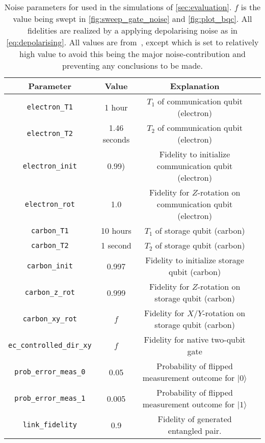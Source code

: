 \begin{table}
  \centering
  \begin{tabular}{||c|c|c|c||}
    \hline
    Parameter                 & Value        & Explanation                                                 \\
    \hline\hline
    \texttt{electron\_T1}          & 1 hour       & $T_1$ of communication qubit (electron)                     \\
    \texttt{electron\_T2}          & 1.46 seconds & $T_2$ of communication qubit (electron)                     \\
    \texttt{electron\_init}        & 0.99)        & Fidelity to initialize communication qubit (electron)       \\
    \texttt{electron\_rot}         & 1.0          & Fidelity for $Z$-rotation on communication qubit (electron) \\
    \texttt{carbon\_T1}            & 10 hours     & $T_1$ of storage qubit (carbon)                             \\
    \texttt{carbon\_T2}            & 1 second     & $T_2$ of storage qubit (carbon)                             \\
    \texttt{carbon\_init}          & 0.997        & Fidelity to initialize storage qubit (carbon)               \\
    \texttt{carbon\_z\_rot}         & 0.999        & Fidelity for $Z$-rotation on storage qubit (carbon)         \\
    \texttt{carbon\_xy\_rot}        & $f$          & Fidelity for $X$/$Y$-rotation on storage qubit (carbon)     \\
    \texttt{ec\_controlled\_dir\_xy} & $f$          & Fidelity for native two-qubit gate                          \\
    \texttt{prob\_error\_meas\_0}    & 0.05         & Probability of flipped measurement outcome for $|0\rangle$  \\
    \texttt{prob\_error\_meas\_1}    & 0.005        & Probability of flipped measurement outcome for $|1\rangle$  \\
    \texttt{link\_fidelity}        & 0.9          & Fidelity of generated entangled pair.                       \\
    \hline
  \end{tabular}
  \caption{
    Noise parameters for used in the simulations of \cref{sec:evaluation}.
    $f$ is the value being swept in \cref{fig:sweep_gate_noise} and \cref{fig:plot_bqc}.
    All fidelities are realized by a applying depolarising noise as in \cref{eq:depolarising}.
    All values are from~\cite{coopmans2021netsquid}, except  which is set to relatively high value to avoid this being the major noise-contribution and preventing any conclusions to be made.
  }
  \label{tab:noise}
\end{table}

